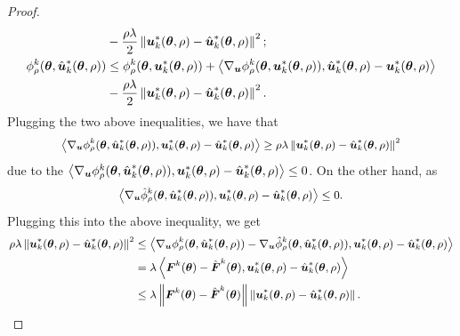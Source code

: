 \begin{proof}
\begin{equation}
\begin{aligned}
			& - \frac{\rho\lambda}{2}\left\|\boldsymbol{u}^{*}_{k}(\text{\boldmath{$\theta$}}, \rho) - \hat{\boldsymbol{u}}^{*}_{k}(\text{\boldmath{$\theta$}}, \rho)\right\|^{2};\\
			\phi^{k}_{\rho}(\text{\boldmath{$\theta$}}, \hat{\boldsymbol{u}}^{*}_{k}(\text{\boldmath{$\theta$}}, \rho)) & \leq \phi^{k}_{\rho}(\text{\boldmath{$\theta$}}, \boldsymbol{u}^{*}_{k}(\text{\boldmath{$\theta$}}, \rho)) + \left\langle\nabla_{\boldsymbol{u}}\phi^{k}_{\rho}(\text{\boldmath{$\theta$}}, \boldsymbol{u}^{*}_{k}(\text{\boldmath{$\theta$}}, \rho)), \hat{\boldsymbol{u}}^{*}_{k}(\text{\boldmath{$\theta$}}, \rho) - \boldsymbol{u}^{*}_{k}(\text{\boldmath{$\theta$}}, \rho)\right\rangle \\
			& - \frac{\rho\lambda}{2}\left\|\boldsymbol{u}^{*}_{k}(\text{\boldmath{$\theta$}}, \rho) - \hat{\boldsymbol{u}}^{*}_{k}(\text{\boldmath{$\theta$}}, \rho)\right\|^{2}.
		\end{aligned}
	\end{equation}
	Plugging the two above inequalities, we have that 
	\begin{equation}
		\small
		\left\langle\nabla_{\bu}\phi^{k}_{\rho}(\btheta, \hat{\bu}^{*}_{k}(\btheta, \rho)), \bu^{*}_{k}(\btheta, \rho) - \hat{\bu}^{*}_{k}(\btheta, \rho)\right\rangle \geq \rho\lambda\left\|\bu^{*}_{k}(\btheta, \rho) - \hat{\bu}^{*}_{k}(\btheta, \rho)\right\|^{2} 
	\end{equation}
	due to the $\left\langle\nabla_{\boldsymbol{u}}\phi^{k}_{\rho}(\text{\boldmath{$\theta$}}, \hat{\boldsymbol{u}}^{*}_{k}(\text{\boldmath{$\theta$}}, \rho)), \boldsymbol{u}^{*}_{k}(\text{\boldmath{$\theta$}}, \rho) - \hat{\boldsymbol{u}}^{*}_{k}(\text{\boldmath{$\theta$}}, \rho)\right\rangle \leq 0$. On the other hand, as  
	\begin{equation}
		\small
		\left\langle\nabla_{\bu}\hat{\phi}^{k}_{\rho}(\btheta, \hat{\bu}^{*}_{k}(\btheta, \rho)), \bu^{*}_{k}(\btheta, \rho) - \hat{\bu}^{*}_{k}(\btheta, \rho)\right\rangle \leq 0.
	\end{equation}
	Plugging this into the above inequality, we get 
	\begin{equation}
		\small
		\begin{aligned}
			\rho\lambda\left\|\bu^{*}_{k}(\btheta, \rho) - \hat{\bu}^{*}_{k}(\btheta, \rho)\right\|^{2} & \leq \left\langle\nabla_{\bu}\phi^{k}_{\rho}(\btheta, \hat{\bu}^{*}_{k}(\btheta, \rho)) - \nabla_{\bu}\hat{\phi}^{k}_{\rho}(\btheta, \hat{\bu}^{*}_{k}(\btheta, \rho)), \bu^{*}_{k}(\btheta, \rho) - \hat{\bu}^{*}_{k}(\btheta, \rho)\right\rangle \\
			& = \lambda\left\langle\bF^{k}(\btheta) - \hat{\bF}^{k}(\btheta), \bu^{*}_{k}(\btheta, \rho) - \hat{\bu}^{*}_{k}(\btheta, \rho)\right\rangle \\
			& \leq \lambda\left\|\bF^{k}(\btheta) - \hat{\bF}^{k}(\btheta)\right\|\left\|\bu^{*}_{k}(\btheta, \rho) - \hat{\bu}^{*}_{k}(\btheta, \rho)\right\|. 
		\end{aligned}
	\end{equation}	

\end{proof}
